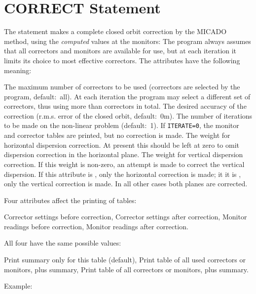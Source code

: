 \section{CORRECT Statement}
\label{S-CORRECT}
The  statement makes a complete closed orbit correction
by the MICADO method, using the {\em computed} values at the monitors:
The program always assumes that all correctors and monitors
are available for use,
but at each iteration it limits its choice to  most
effective correctors.
The attributes have the following meaning:
\begin{mylist}
The maximum number of correctors to be used
(correctors are selected by the program, default:~all).
At each iteration the program may select a different set
of  correctors, thus using more than  correctors
in total.
The desired accuracy of the correction
(r.m.s. error of the closed orbit, default:~0{\rm m}).
The number of iterations to be made on the non-linear problem
(default:~1).
If {\tt ITERATE=0}, the monitor and corrector tables are printed,
but no correction is made.
The weight for horizontal dispersion correction.
At present this should be left at zero to omit dispersion correction
in the horizontal plane.
The weight for vertical dispersion correction.
If this weight is non-zero,
an attempt is made to correct the vertical dispersion.
If this attribute is , only the horizontal correction is made;
it it is , only the vertical correction is made.
In all other cases both planes are corrected.
\end{mylist}
Four attributes affect the printing of tables:
\begin{mylist}
Corrector settings before correction,
Corrector settings after correction,
Monitor readings before correction,
Monitor readings after correction.
\end{mylist}
All four have the same possible values:
\begin{mylist}
Print summary only for this table (default),
Print table of all used correctors or monitors,
plus summary,
Print table of all correctors or monitors, plus summary.
\end{mylist}
Example:

